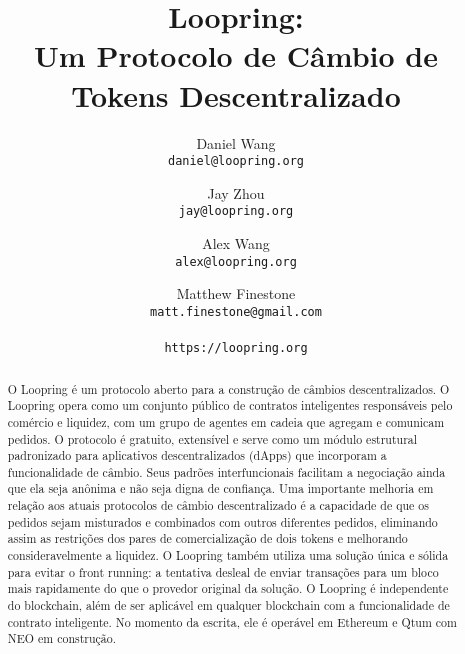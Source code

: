 \documentclass[UTF8,nofonts]{article}
\title{\textbf{Loopring:}\\\textbf{Um Protocolo de Câmbio de Tokens Descentralizado}}
\author{
  Daniel Wang\\
  \texttt{daniel@loopring.org}\\
  \and
  	Jay Zhou\\
  	\texttt{jay@loopring.org}\\
  	\and
  	Alex Wang\\
  	\texttt{alex@loopring.org}\\
  	\and
  	Matthew Finestone\\
  	\texttt{matt.finestone@gmail.com}\\ 
  \\
  \texttt{https://loopring.org}
 }
\begin{document}
\maketitle


\begin{abstract}
O Loopring é um protocolo aberto para a construção de câmbios descentralizados. O Loopring opera como um conjunto público de contratos inteligentes responsáveis pelo comércio e liquidez, com um grupo de agentes em cadeia que agregam e comunicam pedidos. O protocolo é gratuito, extensível e serve como um módulo estrutural padronizado para aplicativos descentralizados (dApps) que incorporam a funcionalidade de câmbio. Seus padrões interfuncionais facilitam a negociação ainda que ela seja anônima e não seja digna de confiança. Uma importante melhoria em relação aos atuais protocolos de câmbio descentralizado é a capacidade de que os pedidos sejam misturados e combinados com outros diferentes pedidos, eliminando assim as restrições dos pares de comercialização de dois tokens e melhorando consideravelmente a liquidez. O Loopring também utiliza uma solução única e sólida para evitar o front running: a tentativa desleal de enviar transações para um bloco mais rapidamente do que o provedor original da solução. O Loopring é independente do blockchain, além de ser aplicável em qualquer blockchain com a funcionalidade de contrato inteligente. No momento da escrita, ele é operável em Ethereum  \cite{buterin2017ethereum} \cite{wood2014ethereum} e Qtum \cite{dai2017smart} com NEO \cite{atterlonn2018distributed} em construção.
\end{abstract}
\end{document}
